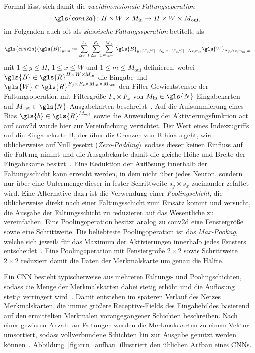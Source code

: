 Formal lässt sich damit die \emph{zweidimensionale Faltungsoperation}
\begin{equation*}
  \gls{conv2d} \colon H \times W \times M_{\mathrm{in}} \to H \times W \times M_{\mathrm{out}},
\end{equation*}
im Folgenden auch oft als \emph{klassische Faltungsoperation} betitelt, als
\begin{equation*}
  {\gls{conv2d}\left(\gls{B}\right)}_{yxm} \coloneqq \sum_{\Delta y = 1}^{F_y} \sum_{\Delta x = 1}^{F_x} \sum_{m_{\mathrm{in}} = 1}^{M_\mathrm{in}} \gls{B}_{y + \left\lceil F_y/2 \right\rceil - \Delta y, x + \left\lceil F_x/2 \right\rceil - \Delta x, m_{\mathrm{in}}} \gls{W}_{\Delta y, \Delta x, m_{\mathrm{in}}, m}
\end{equation*}
mit $1 \leq y \leq H$, $1 \leq x \leq W$ und $1 \leq m \leq M_{\mathrm{out}}$ definieren, wobei $\gls{B} \in \gls{R}^{H \times W \times M_{\mathrm{in}}}$ die Eingabe und $\gls{W} \in \gls{R}^{F_y \times F_x \times M_{\mathrm{in}} \times M_{\mathrm{out}}}$ den Filter \bzw{} Gewichtstensor der Faltungsoperation mit Filtergröße $F_y \times F_x$ von $M_{\mathrm{in}} \in \gls{N}$ Eingabekarten auf $M_{\mathrm{out}} \in \gls{N}$ Ausgabekarten beschreibt~\cite{tensorflow}.
Auf die Aufsummierung eines Bias $\gls{b} \in \gls{R}^{M_{\mathrm{out}}}$ sowie die Anwendung der Aktivierungsfunktion \gls{act} auf \gls{conv2d} wurde hier zur Vereinfachung verzichtet.
Der Wert eines Indexzugriffs auf die Eingabekarte \gls{B}, der über die Grenzen von \gls{B} hinausgeht, wird üblicherweise auf Null gesetzt (\emph{Zero-Padding}), sodass dieser keinen Einfluss auf die Faltung nimmt und die Ausgabekarte damit die gleiche Höhe und Breite der Eingabekarte besitzt~\cite{tensorflow}.
Eine Reduktion der Auflösung innerhalb der Faltungsschicht kann erreicht werden, in dem nicht über jedes Neuron, sondern nur über eine Untermenge dieser in fester Schrittweite $s_y \times s_x$ zueinander gefaltet wird.
Eine Alternative dazu ist die Verwendung einer \emph{Poo\-ling\-sch\-icht}, die üblicherweise direkt nach einer Faltungsschicht zum Einsatz kommt und versucht, die Ausgabe der Faltungsschicht zu reduzieren \bzw{} auf das Wesentliche zu vereinfachen.
Eine Poolingoperation besitzt analog zu \gls{conv2d} eine Fenstergröße sowie eine Schrittweite.
Die beliebteste Poolingoperation ist das \emph{Max-Pooling}, welche sich jeweils für das Maximum der Aktivierungen innerhalb jedes Fensters entscheidet~\cite{Nielsen}.
Eine Poolingoperation mit Fenstergröße $2 \times 2$ sowie Schrittweite $2 \times 2$ reduziert damit die Daten der Merkmalskarte um genau die Hälfte.

Ein \gls{CNN} besteht typischerweise aus mehreren Faltungs- und Poolingschichten, sodass die Menge der Merkmalskarten dabei stetig erhöht und die Auflösung stetig verringert wird~\cite{Nielsen}.
Damit entstehen im späteren Verlauf des Netzes Merkmalskarten, die immer größere Receptive-Fields des Eingabebildes basierend auf den ermittelten Merkmalen vorangegangener Schichten beschreiben.
Nach einer gewissen Anzahl an Faltungen werden die Merkmalskarten zu einem Vektor umsortiert, sodass vollverbundene Schichten hin zur Ausgabe genutzt werden können~\cite{Nielsen}.
Abbildung~\ref{fig:cnn_aufbau} illustriert den üblichen Aufbau eines \glspl{CNN}.


